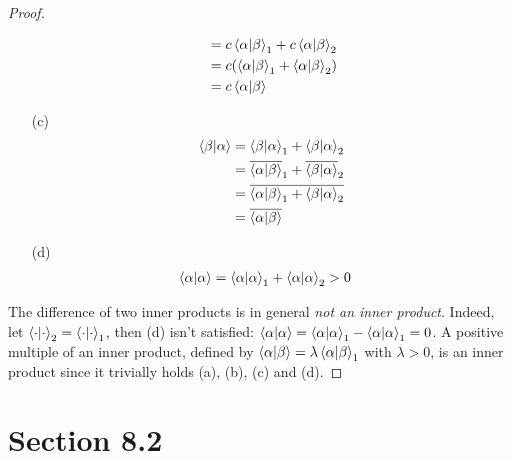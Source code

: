 \documentclass{article}
\theoremstyle{plain}
\theoremstyle{definition}
\theoremstyle{remark}
\begin{document}
\begin{proof}
\begin{itemize}
\begin{align*}
                                        & = c\braket{\alpha}{\beta}_1 + c\braket{\alpha}{\beta}_2\\
                                        & = c(\braket{\alpha}{\beta}_1 +\braket{\alpha}{\beta}_2)\\
                                        & = c\braket{\alpha}{\beta}
            \end{align*}
          \item[(c)]
            \begin{align*}
              \braket{\beta}{\alpha}  & = \braket{\beta}{\alpha}_1 + \braket{\beta}{\alpha}_2\\
                                      & = \overline{\braket{\alpha}{\beta}}_1+  \overline{\braket{\beta}{\alpha}}_2\\
                                      & = \overline{\braket{\alpha}{\beta}_1 + \braket{\beta}{\alpha}_2}\\
                                      & = \overline{\braket{\alpha}{\beta}}
            \end{align*}
          \item[(d)]
            \begin{align*}
              \braket{\alpha}{\alpha} & =  \braket{\alpha}{\alpha}_1 + \braket{\alpha}{\alpha}_2 >0
            \end{align*}
        \end{itemize}
        The difference of two inner products is in general \textit{not an inner product}. Indeed, let $\braket{\cdot}{\cdot}_2 = \braket{\cdot}{\cdot}_1$, then (d) isn't satisfied: $\braket{\alpha}{\alpha} = \braket{\alpha}{\alpha}_1 - \braket{\alpha}{\alpha}_1 = 0$.
        A positive multiple of an inner product, defined by  $\braket{\alpha}{\beta}= \lambda \braket{\alpha}{\beta}_1$ with $\lambda >0$, is an inner product since it trivially holds (a), (b), (c) and (d).
      \end{proof}

  \section*{Section 8.2}
\end{document}
